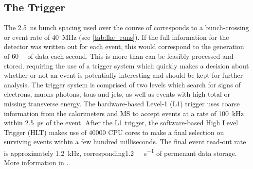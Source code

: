 \subsection{The Trigger}\label{sec:trigger}
The \SI{2.5}{\nano\second} bunch spacing used over the course of \runtwo corresponds to a bunch-crossing or event rate of \SI{40}{\mega\hertz} (see \cref{tab:lhc_runs}).
If the full information for the detector was written out for each event, this would correspond to the generation of \SI{60}{\tera\byte} of data each second.
This is more than can be feasibly processed and stored, requiring the use of a trigger system which quickly makes a decision about whether or not an event is potentially interesting and should be kept for further analysis.
The trigger system is comprised of two levels which search for signs of electrons, muons photons, taus and jets, as well as events with high total or missing transverse energy.
The hardware-based Level-1 (L1) trigger uses coarse information from the calorimeters and MS to accept events at a rate of \SI{100}{\kilo\hertz} within \SI{2.5}{\micro\second} of the event.
After the L1 trigger, the software-based High Level Trigger (HLT) makes use of \num{40000} CPU cores to make a final selection on surviving events within a few hundred milliseconds. 
The final event read-out rate is approximately \SI{1.2}{\kilo\hertz}, corresponding\SI{1.2}{\giga\byte\per\second} of permenant data storage.
More information in \cite{TRIG-2016-01}.


